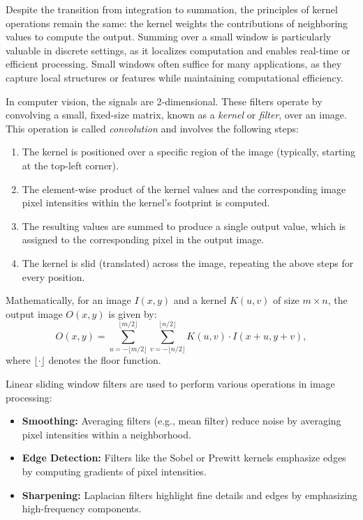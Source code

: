 \documentclass[11pt]{book}
\begin{document}
Despite the transition from integration to summation, the principles of kernel operations remain the same: the kernel weights the contributions of neighboring values to compute the output. Summing over a small window is particularly valuable in discrete settings, as it localizes computation and enables real-time or efficient processing. Small windows often suffice for many applications, as they capture local structures or features while maintaining computational efficiency.


In computer vision, the signals are 2-dimensional. These filters operate by convolving a small, fixed-size matrix, known as a \emph{kernel} or \emph{filter}, over an image. This operation is called \emph{convolution} and involves the following steps:
\begin{enumerate}
    \item The kernel is positioned over a specific region of the image (typically, starting at the top-left corner).
    \item The element-wise product of the kernel values and the corresponding image pixel intensities within the kernel’s footprint is computed.
    \item The resulting values are summed to produce a single output value, which is assigned to the corresponding pixel in the output image.
    \item The kernel is slid (translated) across the image, repeating the above steps for every position.
\end{enumerate}

Mathematically, for an image $I(x, y)$ and a kernel $K(u, v)$ of size $m \times n$, the output image $O(x, y)$ is given by:
\[
O(x, y) = \sum_{u=-\lfloor m/2 \rfloor}^{\lfloor m/2 \rfloor} \sum_{v=-\lfloor n/2 \rfloor}^{\lfloor n/2 \rfloor} K(u, v) \cdot I(x+u, y+v),
\]
where $\lfloor \cdot \rfloor$ denotes the floor function.


Linear sliding window filters are used to perform various operations in image processing:
\begin{itemize}
    \item \textbf{Smoothing:} Averaging filters (e.g., mean filter) reduce noise by averaging pixel intensities within a neighborhood.
    \item \textbf{Edge Detection:} Filters like the Sobel or Prewitt kernels emphasize edges by computing gradients of pixel intensities.
    \item \textbf{Sharpening:} Laplacian filters highlight fine details and edges by emphasizing high-frequency components.
\end{itemize}
\end{document}
